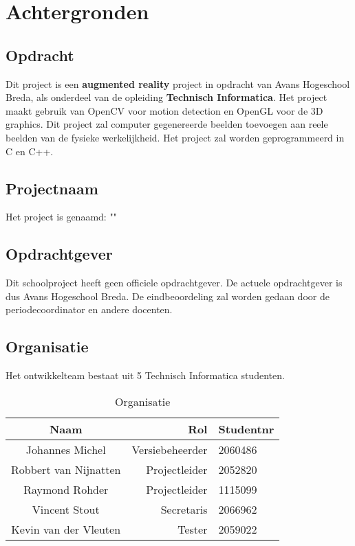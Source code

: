
\chapter{Achtergronden} \label{cha:achtergrond}

\section{Opdracht} \label{sec:opdracht}

Dit project is een \textbf{augmented reality} project in opdracht van Avans Hogeschool Breda, als onderdeel van de opleiding \textbf{Technisch Informatica}. Het project maakt gebruik van OpenCV voor motion detection en OpenGL voor de 3D graphics. Dit project zal computer gegenereerde beelden toevoegen aan reele beelden van de fysieke werkelijkheid. Het project zal worden geprogrammeerd in C en C++.

\section{Projectnaam} \label{sec:projectnaam}
Het project is genaamd: "\projectname"

\section{Opdrachtgever} \label{sec:opdrachtgever}
Dit schoolproject heeft geen officiele opdrachtgever. De actuele opdrachtgever is dus Avans Hogeschool Breda. De eindbeoordeling zal worden gedaan door de periodecoordinator en andere docenten.

\section{Organisatie} \label{sec:organisatie}
Het ontwikkelteam bestaat uit 5 Technisch Informatica studenten.
\begin{table}[h]
  \centering
  \caption{Organisatie}
  \label{tb:table}
  \begin{tabular}{crl}
    \toprule
    Naam     		& Rol			& Studentnr\\
    \midrule
    Johannes Michel	& Versiebeheerder		& 2060486\\
    Robbert van Nijnatten	& Projectleider	& 2052820\\
    Raymond Rohder	& Projectleider	& 1115099\\
    Vincent Stout	& Secretaris	& 2066962\\
    Kevin van der Vleuten	& Tester	& 2059022\\
    \bottomrule
  \end{tabular}
\end{table}

